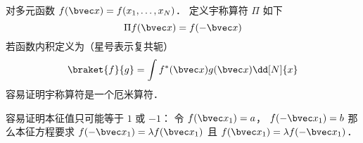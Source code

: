 

对多元函数 $f(\bvec x) = f(x_1, \dots, x_N)$．  定义宇称算符 $\Pi$ 如下
\begin{equation}
\Pi f(\bvec x) = f(-\bvec x)
\end{equation}
若函数内积定义为（星号表示复共轭）
\begin{equation}
\braket{f}{g} = \int f^*(\bvec x) g(\bvec x) \dd[N]{x}
\end{equation}
容易证明宇称算符是一个厄米算符．%

容易证明本征值只可能等于 $1$ 或 $-1$： 令 $f(\bvec x_1) = a$， $f(-\bvec x_1) = b$ 那么本征方程要求 $f(-\bvec x_1) = \lambda f(\bvec x_1)$ 且 $f(\bvec x_1) = \lambda f(-\bvec x_1)$．
